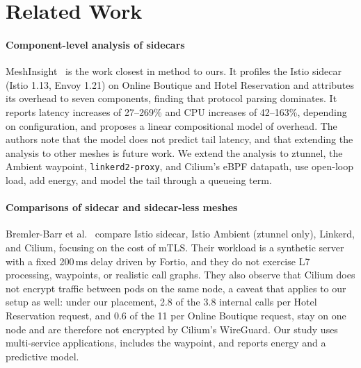 \section{Related Work}
\label{sec:related}

\paragraph{Component-level analysis of sidecars}
MeshInsight~\cite{zhu2023meshinsight} is the work closest in method to ours.
It profiles the Istio sidecar (Istio 1.13, Envoy 1.21) on Online Boutique and
Hotel Reservation and attributes its overhead to seven components, finding that
protocol parsing dominates. It reports latency increases of 27--269\% and CPU
increases of 42--163\%, depending on configuration, and proposes a linear
compositional model of overhead. The authors note that the model does not
predict tail latency, and that extending the analysis to other meshes is future
work. We extend the analysis to ztunnel, the Ambient waypoint,
\texttt{linkerd2-proxy}, and Cilium's eBPF datapath, use open-loop load, add
energy, and model the tail through a queueing term.

\paragraph{Comparisons of sidecar and sidecar-less meshes}
Bremler-Barr et al.~\cite{bremlerbarr2024mtls} compare Istio sidecar, Istio
Ambient (ztunnel only), Linkerd, and Cilium, focusing on the cost of mTLS. Their
workload is a synthetic server with a fixed 200\,ms delay driven by Fortio, and
they do not exercise L7 processing, waypoints, or realistic call graphs. They
also observe that Cilium does not encrypt traffic between pods on the same node,
a caveat that applies to our setup as well: under our placement, 2.8 of the
3.8 internal calls per Hotel Reservation request, and 0.6 of the 11 per Online
Boutique request, stay on one node and are therefore not encrypted by Cilium's
WireGuard. Our study uses multi-service
applications, includes the waypoint, and reports energy and a predictive model.

